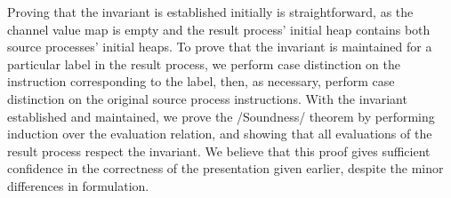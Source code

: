 Proving that the invariant is established initially is straightforward, as the channel value map is empty and the result process' initial heap contains both source processes' initial heaps.
To prove that the invariant is maintained for a particular label in the result process, we perform case distinction on the instruction corresponding to the label, then, as necessary, perform case distinction on the original source process instructions.
With the invariant established and maintained, we prove the \Hs/Soundness/ theorem by performing induction over the evaluation relation, and showing that all evaluations of the result process respect the invariant.
We believe that this proof gives sufficient confidence in the correctness of the presentation given earlier, despite the minor differences in formulation.

% 

